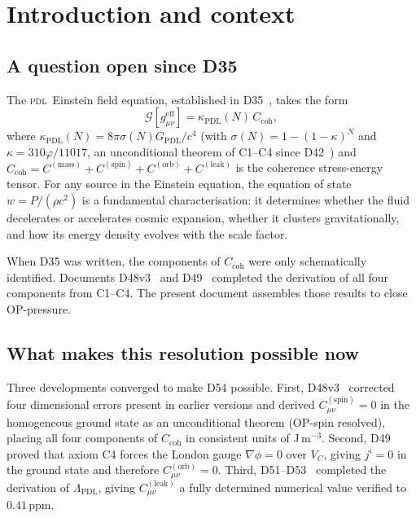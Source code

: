 \documentclass[12pt,a4paper]{article}
\newcommand{\PDL}{\textsc{pdl}}
\newcommand{\Ccoh}{C_{\mathrm{coh}}}
\newcommand{\Cmass}{C^{(\mathrm{mass})}}
\newcommand{\Cspin}{C^{(\mathrm{spin})}}
\newcommand{\Corb}{C^{(\mathrm{orb})}}
\newcommand{\Cleak}{C^{(\mathrm{leak})}}
\newcommand{\sig}{\sigma}
\newcommand{\kPDL}{\kappa_{\mathrm{PDL}}}
\newcommand{\GPDL}{G_{\mathrm{PDL}}}
\newcommand{\geff}{g_{\mu\nu}^{\mathrm{eff}}}
\newcommand{\VC}{V_C}
\newcommand{\LambdaPDL}{\Lambda_{\mathrm{PDL}}}
\newcommand{\vp}{\varphi}
\begin{document}
\clearpage
\tableofcontents
\newpage

\section{Introduction and context}
\label{sec:intro}

\subsection{A question open since D35}

The \PDL\ Einstein field equation, established in D35~\cite{PDL_D35_2026}, takes the form
\begin{equation}
\mathcal{G}[\geff] = \kPDL(N)\,\Ccoh,
\label{eq:Einstein}
\end{equation}
where $\kPDL(N) = 8\pi\sig(N)\GPDL/c^4$ (with $\sig(N) = 1-(1-\kappa)^N$ and $\kappa = 310\vp/11017$, an unconditional theorem of C1--C4 since D42~\cite{PDL_D42_2026}) and $\Ccoh = \Cmass + \Cspin + \Corb + \Cleak$ is the coherence stress-energy tensor. For any source in the Einstein equation, the equation of state $w = P/(\rho c^2)$ is a fundamental characterisation: it determines whether the fluid decelerates or accelerates cosmic expansion, whether it clusters gravitationally, and how its energy density evolves with the scale factor.

When D35 was written, the components of $\Ccoh$ were only schematically identified. Documents D48v3~\cite{PDL_D48v3_2026} and D49~\cite{PDL_D49_2026} completed the derivation of all four components from C1--C4. The present document assembles those results to close OP-pressure.

\subsection{What makes this resolution possible now}

Three developments converged to make D54 possible. First, D48v3~\cite{PDL_D48v3_2026} corrected four dimensional errors present in earlier versions and derived $\Cspin_{\mu\nu} = 0$ in the homogeneous ground state as an unconditional theorem (OP-spin resolved), placing all four components of $\Ccoh$ in consistent units of J\,m$^{-3}$. Second, D49~\cite{PDL_D49_2026} proved that axiom C4 forces the London gauge $\nabla\phi = 0$ over $\VC$, giving $j^i = 0$ in the ground state and therefore $\Corb_{\mu\nu} = 0$. Third, D51--D53~\cite{PDL_D51_2026,PDL_D52_2026,PDL_D53_2026} completed the derivation of $\LambdaPDL$, giving $\Cleak_{\mu\nu}$ a fully determined numerical value verified to $0.41$\,ppm.
\end{document}
